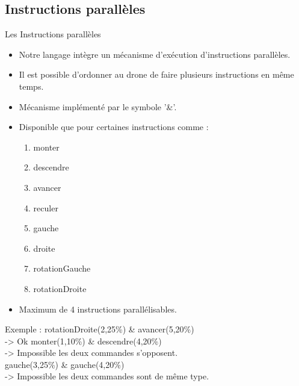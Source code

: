 \documentclass{bredelebeamer}
\begin{document}
	\subsection{Instructions parallèles} 
\begin{frame}{Les Instructions parallèles} 
\begin{itemize}
\item Notre langage intègre un mécanisme d'exécution d'instructions parallèles.
\item Il est possible d'ordonner au drone de faire plusieurs instructions en même temps. 
\item Mécanisme implémenté par le symbole '\&'. \pause
\item Disponible que pour certaines instructions comme :  
	\begin{enumerate}
		\item monter
		\item descendre
		\item avancer
		\item reculer
		\item gauche
		\item droite
		\item rotationGauche
		\item rotationDroite
	\end{enumerate}	\pause
\item Maximum de 4 instructions parallélisables.
\end{itemize}
Exemple : \newline
\color{Framarouge}rotationDroite(\color{black}2\color{Framarouge},\color{Framagris}25\%\color{Framarouge}) \& 
	\color{Framarouge}avancer(\color{black}5\color{Framarouge},\color{Framagris}20\%\color{Framarouge})\\ \pause
	\color{black}-> Ok \newline
	\color{Framarouge}monter(\color{black}1\color{Framarouge},\color{Framagris}10\%\color{Framarouge}) \& 
	\color{Framarouge}descendre(\color{black}4\color{Framarouge},\color{Framagris}20\%\color{Framarouge})\\ \pause
	\color{black}-> Impossible les deux commandes s'opposent.\\
	\color{Framarouge}gauche(\color{black}3\color{Framarouge},\color{Framagris}25\%\color{Framarouge}) \& 
	\color{Framarouge}gauche(\color{black}4\color{Framarouge},\color{Framagris}20\%\color{Framarouge})\\ \pause
	\color{black}-> Impossible les deux commandes sont de même type.\\

\end{frame}
	
\end{document}
